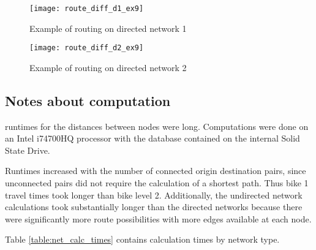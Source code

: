 \begin{figure}
\centering
\texttt{[image: route\_diff\_d1\_ex9]}
\caption{Example of routing on directed network 1}
\label{fig:routing_1}
\end{figure}

\begin{figure}
\centering
\texttt{[image: route\_diff\_d2\_ex9]}
\caption{Example of routing on directed network 2}
\label{fig:routing_2}
\end{figure}

%
%
% 
%
%
%
%
%
%





\subsection{Notes about computation}

runtimes for the distances between nodes were long. Computations were done on an Intel i74700HQ processor with the database contained on the internal Solid State Drive. 

Runtimes increased with the number of connected origin destination pairs, since unconnected pairs  did not require the calculation of a shortest path. Thus bike 1 travel times took longer than bike level 2. Additionally, the undirected network calculations took substantially longer than the directed networks because there were significantly more route possibilities with more edges available at each node. 

Table \ref{table:net_calc_times} contains calculation times by network type. 



